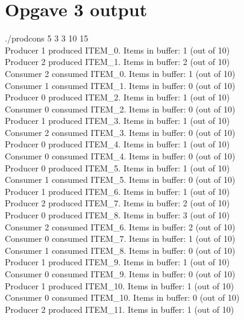 \appendix
\label{Appendix}

%
%
\section{Opgave 3 output}
\label{O3_Output}
./prodcons 5 3 3 10 15
\\Producer 1 produced ITEM\_0. Items in buffer: 1 (out of 10)
\\Producer 2 produced ITEM\_1. Items in buffer: 2 (out of 10)
\\Consumer 2 consumed ITEM\_0. Items in buffer: 1 (out of 10)
\\Consumer 1 consumed ITEM\_1. Items in buffer: 0 (out of 10)
\\Producer 0 produced ITEM\_2. Items in buffer: 1 (out of 10)
\\Consumer 0 consumed ITEM\_2. Items in buffer: 0 (out of 10)
\\Producer 1 produced ITEM\_3. Items in buffer: 1 (out of 10)
\\Consumer 2 consumed ITEM\_3. Items in buffer: 0 (out of 10)
\\Producer 0 produced ITEM\_4. Items in buffer: 1 (out of 10)
\\Consumer 0 consumed ITEM\_4. Items in buffer: 0 (out of 10)
\\Producer 0 produced ITEM\_5. Items in buffer: 1 (out of 10)
\\Consumer 1 consumed ITEM\_5. Items in buffer: 0 (out of 10)
\\Producer 1 produced ITEM\_6. Items in buffer: 1 (out of 10)
\\Producer 2 produced ITEM\_7. Items in buffer: 2 (out of 10)
\\Producer 0 produced ITEM\_8. Items in buffer: 3 (out of 10)
\\Consumer 2 consumed ITEM\_6. Items in buffer: 2 (out of 10)
\\Consumer 0 consumed ITEM\_7. Items in buffer: 1 (out of 10)
\\Consumer 1 consumed ITEM\_8. Items in buffer: 0 (out of 10)
\\Producer 1 produced ITEM\_9. Items in buffer: 1 (out of 10)
\\Consumer 0 consumed ITEM\_9. Items in buffer: 0 (out of 10)
\\Producer 1 produced ITEM\_10. Items in buffer: 1 (out of 10)
\\Consumer 0 consumed ITEM\_10. Items in buffer: 0 (out of 10)
\\Producer 2 produced ITEM\_11. Items in buffer: 1 (out of 10)
